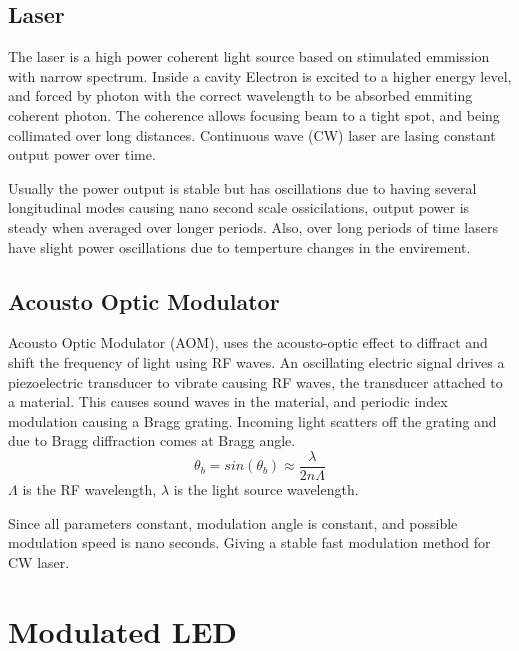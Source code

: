 \documentclass[\main/master.tex]{subfiles}
\begin{document}
\subsection{Laser}


The laser is a high power coherent light source based on stimulated emmission with narrow spectrum. Inside a cavity Electron is excited to a higher energy level, and forced by photon with the correct wavelength to be absorbed emmiting coherent photon. The coherence allows focusing beam to a tight spot, and being collimated over long distances. Continuous wave (CW) laser are lasing constant output power over time.



\par
Usually the power output is stable but has oscillations due to having several longitudinal modes causing nano second scale ossicilations, output power is steady when averaged over longer periods. Also, over long periods of time lasers have slight power oscillations due to temperture changes in the envirement.

\subsection{Acousto Optic Modulator}
Acousto Optic Modulator (AOM), uses the acousto-optic effect to diffract and shift the frequency of light using RF waves. An oscillating electric signal drives a piezoelectric transducer to vibrate causing RF waves, the transducer attached to a material. This causes sound waves in the material, and periodic index modulation causing a Bragg grating. Incoming light scatters off the grating and due to Bragg diffraction comes at Bragg angle.
\begin{equation}
\theta_b = sin(\theta_b)\approx \frac{\lambda}{2n\Lambda} \label{eqn:energy-mass-equivalence-relation}
\end{equation} 
$\Lambda$ is the RF wavelength, $\lambda$ is the light source wavelength. 
\par
Since all parameters constant, modulation angle is constant, and possible modulation speed is nano seconds. Giving a stable fast modulation method for CW laser.


\section{Modulated LED}
\end{document}
